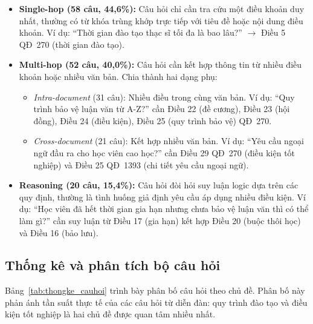 \begin{itemize}
    \item \textbf{Single-hop (58 câu, 44,6\%):} Câu hỏi chỉ cần tra cứu một điều
          khoản duy nhất, thường có từ khóa trùng khớp trực tiếp với tiêu đề hoặc
          nội dung điều khoản. Ví dụ: ``Thời gian đào tạo thạc sĩ tối đa là bao
          lâu?'' $\to$ Điều 5 QĐ~270 (thời gian đào tạo).

    \item \textbf{Multi-hop (52 câu, 40,0\%):} Câu hỏi cần kết hợp thông tin từ
          nhiều điều khoản hoặc nhiều văn bản. Chia thành hai dạng phụ:
          \begin{itemize}
            \item \textit{Intra-document} (31 câu): Nhiều điều trong cùng văn bản.
                  Ví dụ: ``Quy trình bảo vệ luận văn từ A-Z?'' cần Điều 22
                  (đề cương), Điều 23 (hội đồng), Điều 24 (điều kiện), Điều 25
                  (quy trình bảo vệ) QĐ~270.
            \item \textit{Cross-document} (21 câu): Kết hợp nhiều văn bản. Ví dụ:
                  ``Yêu cầu ngoại ngữ đầu ra cho học viên cao học?'' cần Điều 29
                  QĐ~270 (điều kiện tốt nghiệp) và Điều 25 QĐ~1393 (chi tiết yêu
                  cầu ngoại ngữ).
          \end{itemize}

    \item \textbf{Reasoning (20 câu, 15,4\%):} Câu hỏi đòi hỏi suy luận logic dựa
          trên các quy định, thường là tình huống giả định yêu cầu áp dụng nhiều
          điều kiện. Ví dụ: ``Học viên đã hết thời gian gia hạn nhưng chưa bảo vệ
          luận văn thì có thể làm gì?'' cần suy luận từ Điều 17 (gia hạn) kết hợp
          Điều 20 (buộc thôi học) và Điều 16 (bảo lưu).
\end{itemize}

\subsection{Thống kê và phân tích bộ câu hỏi}
\label{subsec:thongke_cauhoi}

Bảng~\ref{tab:thongke_cauhoi} trình bày phân bố câu hỏi theo chủ đề. Phân bố này
phản ánh tần suất thực tế của các câu hỏi từ diễn đàn: quy trình đào tạo và điều
kiện tốt nghiệp là hai chủ đề được quan tâm nhiều nhất.

